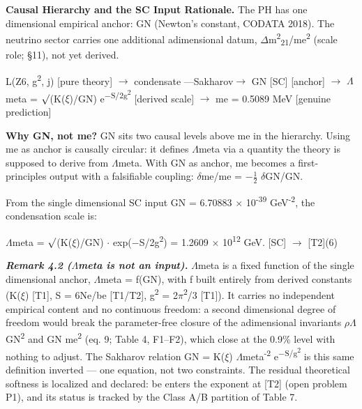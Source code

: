 \documentclass[11pt,letterpaper]{article}
\begin{document}
\noindent \textbf{Causal Hierarchy and the SC Input Rationale. }The PH has one dimensional empirical anchor: GN (Newton's constant, CODATA 2018). The neutrino sector carries one additional adimensional datum, $\Delta$m\textsuperscript{2}\textsubscript{21}/me\textsuperscript{2} (scale role; §11), not yet derived.

\begingroup\centering L(Z6, g\textsuperscript{2}, j) [pure theory] $\to$ condensate ---Sakharov$\to$ GN [SC] [anchor] $\to$ $\Lambda$meta = $\surd$(K($\xi$)/GN) e\textsuperscript{$-$S/2g\textsuperscript{2}} [derived scale] $\to$ me = 0.5089 MeV [genuine prediction]\par\endgroup

\noindent \textbf{Why GN, not me? }GN sits two causal levels above me in the hierarchy. Using me as anchor is causally circular: it defines $\Lambda$meta via a quantity the theory is supposed to derive from $\Lambda$meta. With GN as anchor, me becomes a first-principles output with a falsifiable coupling: $\delta$me/me = $-$$\tfrac{1}{2}$ $\delta$GN/GN.

\noindent From the single dimensional SC input GN = 6.70883 $\times$ 10\textsuperscript{-39} GeV\textsuperscript{-2}, the condensation scale is:

\begingroup\centering $\Lambda$meta = $\surd$(K($\xi$)/GN) $\cdot$ exp($-$S/2g\textsuperscript{2}) = 1.2609 $\times$ 10\textsuperscript{12} GeV.   [SC] $\to$ [T2]\hspace{2em}(6)\par\endgroup

\noindent \textbf{\textit{Remark 4.2 ($\Lambda$meta is not an input). }}$\Lambda$meta is a fixed function of the single dimensional anchor, $\Lambda$meta = f(GN), with f built entirely from derived constants (K($\xi$) [T1], S = 6Ne/be [T1/T2], g\textsuperscript{2} = 2$\pi$\textsuperscript{2}/3 [T1]). It carries no independent empirical content and no continuous freedom: a second dimensional degree of freedom would break the parameter-free closure of the adimensional invariants $\rho$$\Lambda$GN\textsuperscript{2} and GN me\textsuperscript{2} (eq. 9; Table 4, F1--F2), which close at the 0.9\% level with nothing to adjust. The Sakharov relation GN = K($\xi$) $\Lambda$meta\textsuperscript{-2} e\textsuperscript{$-$S/g\textsuperscript{2}} is this same definition inverted --- one equation, not two constraints. The residual theoretical softness is localized and declared: be enters the exponent at [T2] (open problem P1), and its status is tracked by the Class A/B partition of Table 7.
\end{document}
